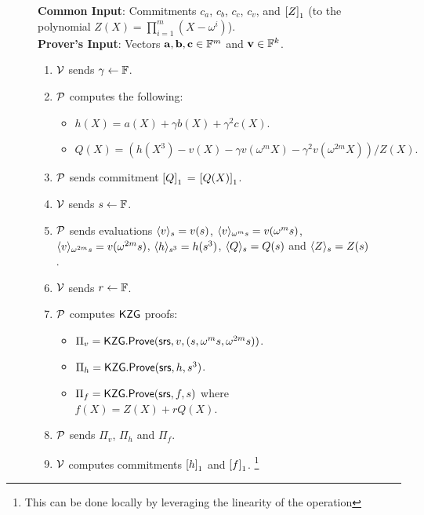 \begin{figure}[htbp]
	\begin{mdframed}
		{
			{\bf Common Input}: Commitments $c_a$, $c_b$, $c_c$, $c_v$, and $\gone{Z}$ (to the polynomial
			$Z(X)=\prod_{i=1}^m (X-\omega^i)$). \\
			{\bf Prover's Input}: Vectors $\vec{a},\vec{b},\vec{c}\in\F^m$ and $\vec{v}\in \F^k$.
			\begin{enumerate}[leftmargin=1em, label=\arabic*.]
				\item $\verifier$ sends $\gamma\gets \F$.
				\item $\prover$ computes the following:
				\begin{itemize}[leftmargin=1em, label=-]
					\item $h(X) = a(X) + \gamma b(X) + \gamma^2 c(X)$.
					\item $Q(X) = (h(X^3) - v(X) - \gamma v(\omega^m X) - \gamma^2 v(\omega^{2m} X))/Z(X).$
				\end{itemize}
				\item $\prover$ sends commitment $\gone{Q}$ = $\gone{Q(X)}$.
				\item $\verifier$ sends $s\gets\F$.
				\item $\prover$ sends evaluations $\val{s}{v}=v(s)$, $\val{\omega^m s}{v}=v(\omega^m s)$,
				$\val{\omega^{2m}s}{v}=v(\omega^{2m} s)$, $\val{s^3}{h}=h(s^3)$, $\val{s}{Q}=Q(s)$ and $\val{s}{Z}=Z(s)$.
				\item $\verifier$ sends $r\gets\F$.
				\item $\prover$ computes $\kzg$ proofs:
				\begin{itemize}[leftmargin=1em, label=-]
					\item $\Pi_v=\kzgprove(\srs,v,(s,\omega^m s, \omega^{2m}s))$.
					\item $\Pi_h=\kzgprove(\srs,h,s^3)$.
					\item $\Pi_f=\kzgprove(\srs,f,s)$ where $f(X)=Z(X) + rQ(X)$.
				\end{itemize}
				\item $\prover$ sends $\Pi_v$, $\Pi_h$ and $\Pi_f$.
				\item $\verifier$ computes commitments $\gone{h}$ and $\gone{f}$. \footnote{This can be done locally by leveraging the linearity of the operation}

\end{enumerate}}
\end{mdframed}
\end{figure}
